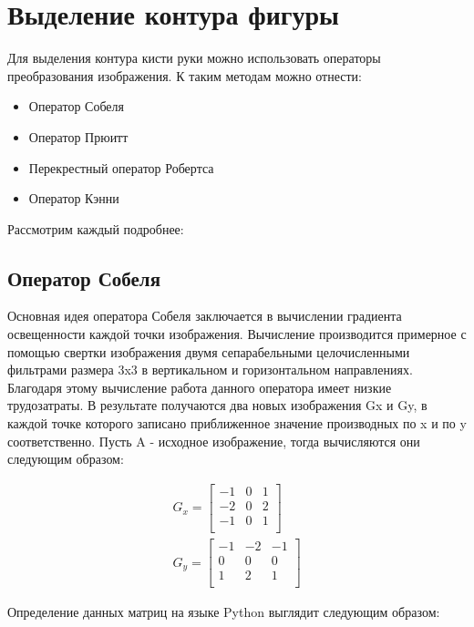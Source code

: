 \section{Выделение контура фигуры}
\label{sec:Edge}

Для выделения контура кисти руки можно использовать операторы преобразования изображения. К таким методам можно отнести:

\begin{itemize}
	\item Оператор Собеля
	\item Оператор Прюитт
	\item Перекрестный оператор Робертса
	\item Оператор Кэнни
\end{itemize}

Рассмотрим каждый подробнее:

\subsection{Оператор Собеля}

Основная идея оператора Собеля \cite{Sobel} заключается в вычислении градиента освещенности каждой точки изображения. Вычисление производится примерное с помощью свертки изображения двумя сепарабельными целочисленными фильтрами размера 3x3 в вертикальном и горизонтальном направлениях. Благодаря этому вычисление работа данного оператора имеет низкие трудозатраты. В результате получаются два новых изображения Gx и Gy, в каждой точке которого записано приближенное значение производных по x и по y соответственно. Пусть A - исходное изображение, тогда вычисляются они следующим образом:

\begin{eqnarray}\label{eq:sobel-matrixs}
G_x = \begin{bmatrix}
-1 & 0 & 1\\
-2 & 0 & 2\\
-1 & 0 & 1\\
\end{bmatrix} \\
G_y = \begin{bmatrix}
-1 & -2 & -1\\
0 & 0 & 0\\
1 & 2 & 1\\
\end{bmatrix}
\end{eqnarray}

Определение данных матриц на языке Python выглядит следующим образом:

